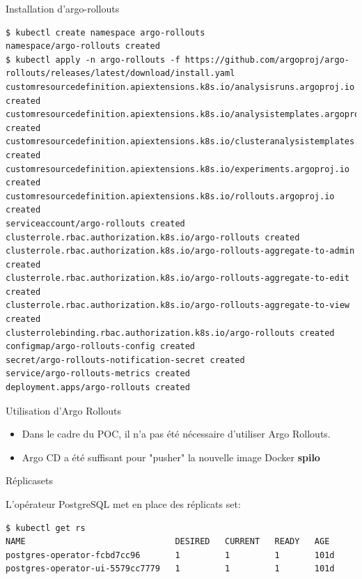 \begin{frame}[fragile]{Installation d'argo-rollouts}

\begin{tiny}
\begin{Verbatim}[commandchars=\&\#\#]
$ kubectl create namespace argo-rollouts
namespace/argo-rollouts created
$ kubectl apply -n argo-rollouts -f https://github.com/argoproj/argo-rollouts/releases/latest/download/install.yaml
customresourcedefinition.apiextensions.k8s.io/analysisruns.argoproj.io created
customresourcedefinition.apiextensions.k8s.io/analysistemplates.argoproj.io created
customresourcedefinition.apiextensions.k8s.io/clusteranalysistemplates.argoproj.io created
customresourcedefinition.apiextensions.k8s.io/experiments.argoproj.io created
customresourcedefinition.apiextensions.k8s.io/rollouts.argoproj.io created
serviceaccount/argo-rollouts created
clusterrole.rbac.authorization.k8s.io/argo-rollouts created
clusterrole.rbac.authorization.k8s.io/argo-rollouts-aggregate-to-admin created
clusterrole.rbac.authorization.k8s.io/argo-rollouts-aggregate-to-edit created
clusterrole.rbac.authorization.k8s.io/argo-rollouts-aggregate-to-view created
clusterrolebinding.rbac.authorization.k8s.io/argo-rollouts created
configmap/argo-rollouts-config created
secret/argo-rollouts-notification-secret created
service/argo-rollouts-metrics created
deployment.apps/argo-rollouts created
\end{Verbatim}
\end{tiny}

\end{frame}


\begin{frame}[fragile]{Utilisation d'Argo Rollouts}

\begin{itemize}
   \item Dans le cadre du POC, il n'a pas été nécessaire d'utiliser Argo Rollouts.
   \item Argo CD a été suffisant pour "pusher" la nouvelle image Docker \textbf{spilo}
\end{itemize}

\end{frame}


\begin{frame}[fragile]{Réplicasets}

   L'opérateur PostgreSQL met en place des réplicats set:
\begin{tiny}
\begin{Verbatim}[commandchars=\&\#\#]
$ kubectl get rs
NAME                              DESIRED   CURRENT   READY   AGE
postgres-operator-fcbd7cc96       1         1         1       101d
postgres-operator-ui-5579cc7779   1         1         1       101d
\end{Verbatim}
\end{tiny}

\end{frame}

